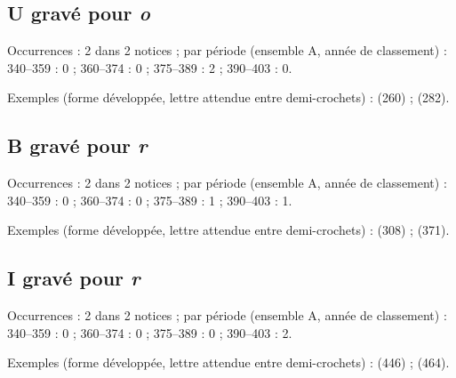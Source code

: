 \subsection*{U gravé pour \textit{o}}
\noindent Occurrences : 2 dans 2 notices ; par période (ensemble A, année de classement) : 340–359 : 0 ; 360–374 : 0 ; 375–389 : 2 ; 390–403 : 0.\par
\noindent Exemples (forme développée, lettre attendue entre demi-crochets) :  (260) ;  (282).\par
{}\par\medskip
\subsection*{B gravé pour \textit{r}}
\noindent Occurrences : 2 dans 2 notices ; par période (ensemble A, année de classement) : 340–359 : 0 ; 360–374 : 0 ; 375–389 : 1 ; 390–403 : 1.\par
\noindent Exemples (forme développée, lettre attendue entre demi-crochets) :  (308) ;  (371).\par
{}\par\medskip
\subsection*{I gravé pour \textit{r}}
\noindent Occurrences : 2 dans 2 notices ; par période (ensemble A, année de classement) : 340–359 : 0 ; 360–374 : 0 ; 375–389 : 0 ; 390–403 : 2.\par
\noindent Exemples (forme développée, lettre attendue entre demi-crochets) :  (446) ;  (464).\par
{}\par\medskip

